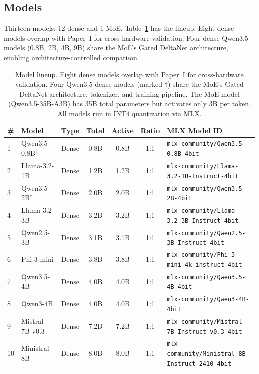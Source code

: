\documentclass[11pt]{article}
\begin{document}
\subsection{Models}
\label{sec:models}

Thirteen models: 12 dense and 1 MoE.  Table~\ref{tab:models} has the lineup.  Eight dense models overlap with Paper~I for cross-hardware validation.  Four dense Qwen3.5 models (0.8B, 2B, 4B, 9B) share the MoE's Gated DeltaNet architecture, enabling architecture-controlled comparison.

\begin{table}[t]
\centering
\caption{Model lineup.  Eight dense models overlap with Paper~I for cross-hardware validation.  Four Qwen3.5 dense models (marked $\dagger$) share the MoE's Gated DeltaNet architecture, tokenizer, and training pipeline.  The MoE model (Qwen3.5-35B-A3B) has 35B total parameters but activates only 3B per token.  All models run in INT4 quantization via MLX.}
\label{tab:models}
\small
\begin{tabular}{llccccl}
\toprule
\textbf{\#} & \textbf{Model} & \textbf{Type} & \textbf{Total} & \textbf{Active} & \textbf{Ratio} & \textbf{MLX Model ID} \\
\midrule
1 & Qwen3.5-0.8B$^\dagger$ & Dense & 0.8B & 0.8B & 1:1 & \texttt{mlx-community/Qwen3.5-0.8B-4bit} \\
2 & Llama-3.2-1B & Dense & 1.2B & 1.2B & 1:1 & \texttt{mlx-community/Llama-3.2-1B-Instruct-4bit} \\
3 & Qwen3.5-2B$^\dagger$ & Dense & 2.0B & 2.0B & 1:1 & \texttt{mlx-community/Qwen3.5-2B-4bit} \\
4 & Llama-3.2-3B & Dense & 3.2B & 3.2B & 1:1 & \texttt{mlx-community/Llama-3.2-3B-Instruct-4bit} \\
5 & Qwen2.5-3B & Dense & 3.1B & 3.1B & 1:1 & \texttt{mlx-community/Qwen2.5-3B-Instruct-4bit} \\
6 & Phi-3-mini & Dense & 3.8B & 3.8B & 1:1 & \texttt{mlx-community/Phi-3-mini-4k-instruct-4bit} \\
7 & Qwen3.5-4B$^\dagger$ & Dense & 4.0B & 4.0B & 1:1 & \texttt{mlx-community/Qwen3.5-4B-4bit} \\
8 & Qwen3-4B & Dense & 4.0B & 4.0B & 1:1 & \texttt{mlx-community/Qwen3-4B-4bit} \\
9 & Mistral-7B-v0.3 & Dense & 7.2B & 7.2B & 1:1 & \texttt{mlx-community/Mistral-7B-Instruct-v0.3-4bit} \\
10 & Ministral-8B & Dense & 8.0B & 8.0B & 1:1 & \texttt{mlx-community/Ministral-8B-Instruct-2410-4bit} \\

\end{tabular}
\end{table}
\end{document}

